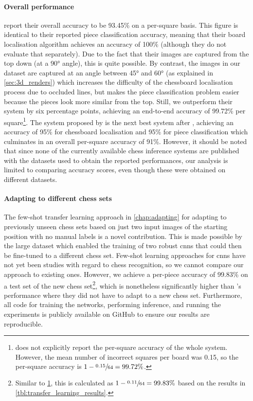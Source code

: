 \documentclass[../main.tex]{subfiles}
\begin{document}
\paragraph{Overall performance}
\Textcite{mehta2020} report their overall accuracy to be 93.45\% on a per-square basis.
This figure is identical to their reported piece classification accuracy, meaning that their board localisation algorithm achieves an accuracy of 100\% (although they do not evaluate that separately).
Due to the fact that their images are captured from the top down (at a 90° angle), this is quite possible.
By contrast, the images in our dataset are captured at an angle between 45° and 60° (as explained in \cref{sec:3d_renders}) which increases the difficulty of the chessboard localisation process due to occluded lines, but makes the piece classification problem easier because the pieces look more similar from the top.
Still, we outperform their system by six percentage points, achieving an end-to-end accuracy of 99.72\% per square\footnote{
    \label{ft:per_piece}
     does not explicitly report the per-square accuracy of the whole system.
    However, the mean number of incorrect squares per board was 0.15, so the per-square accuracy is $1-\sfrac{0.15}{64}=99.72\%$.
}.
The system proposed by \Textcite{czyzewski2020} is the next best system after \cite{mehta2020}, achieving an accuracy of 95\% for chessboard localisation and 95\% for piece classification which culminates in an overall per-square accuracy of 91\%.
However, it should be noted that since none of the currently available chess inference systems are published with the datasets used to obtain the reported performances, our analysis is limited to comparing accuracy scores, even though these were obtained on different datasets.

\paragraph{Adapting to different chess sets}
The few-shot transfer learning approach in \cref{chap:adapting} for adapting to previously unseen chess sets based on just two input images of the starting position with no manual labels is a novel contribution.
This is made possible by the large dataset which enabled the training of two robust \glspl{cnn} that could then be fine-tuned to a different chess set.
Few-shot learning approaches for \glspl{cnn} have not yet been studies with regard to chess recognition, so we cannot compare our approach to existing ones.
However, we achieve a per-piece accuracy of 99.83\% on a test set of the new chess set\footnote{
    Similar to \cref{ft:per_piece}, this is calculated as $1-\sfrac{0.11}{64}=99.83\%$ based on the results in \cref{tbl:transfer_learning_results}.
}, which is nonetheless significantly higher than \textcite{mehta2020}'s performance where they did not have to adapt to a new chess set.
Furthermore, all code for training the networks, performing inference, and running the experiments is publicly available on GitHub to ensure our results are reproducible.

\ifSubfilesClassLoaded{%
\printglossary[type=\acronymtype]%
\printbibliography%
}{}%
\end{document}
